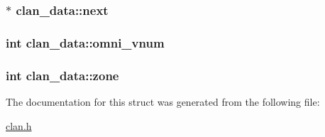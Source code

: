 \hypertarget{structclan__data_a5e5e8b39a00ecd7634bf12da626dd0e0}{
\subsubsection[{next}]{$\ast$ clan\-\_\-data\-::next}}\label{structclan__data_a5e5e8b39a00ecd7634bf12da626dd0e0}
\hypertarget{structclan__data_a022cca2ea2c9cf355b2abf604c8f5db7}{
\subsubsection[{omni\-\_\-vnum}]{\setlength{\rightskip}{0pt plus 5cm}int clan\-\_\-data\-::omni\-\_\-vnum}}\label{structclan__data_a022cca2ea2c9cf355b2abf604c8f5db7}
\hypertarget{structclan__data_a776801bc7444a9e38f4f9b7b6e9dd43a}{
\subsubsection[{zone}]{\setlength{\rightskip}{0pt plus 5cm}int clan\-\_\-data\-::zone}}\label{structclan__data_a776801bc7444a9e38f4f9b7b6e9dd43a}


The documentation for this struct was generated from the following file\-:\begin{DoxyCompactItemize}
\item 
\hyperlink{clan_8h}{clan.\-h}\end{DoxyCompactItemize}
